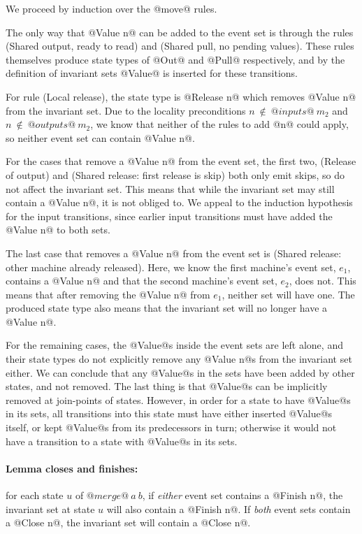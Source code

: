 We proceed by induction over the @move@ rules.

The only way that @Value n@ can be added to the event set is through the rules (Shared output, ready to read) and (Shared pull, no pending values).
These rules themselves produce state types of @Out@ and @Pull@ respectively, and by the definition of invariant sets @Value@ is inserted for these transitions.

For rule (Local release), the state type is @Release n@ which removes @Value n@ from the invariant set.
Due to the locality preconditions $n~\not\in~@inputs@~m_2$ and $n~\not\in~@outputs@~m_2$, we know that neither of the rules to add @n@ could apply, so neither event set can contain @Value n@.

For the cases that remove a @Value n@ from the event set, the first two, (Release of output) and (Shared release: first release is skip) both only emit skips, so do not affect the invariant set.
This means that while the invariant set may still contain a @Value n@, it is not obliged to.
We appeal to the induction hypothesis for the input transitions, since earlier input transitions must have added the @Value n@ to both sets.

The last case that removes a @Value n@ from the event set is (Shared release: other machine already released).
Here, we know the first machine's event set, $e_1$, contains a @Value n@ and that the second machine's event set, $e_2$, does not.
This means that after removing the @Value n@ from $e_1$, neither set will have one.
The produced state type also means that the invariant set will no longer have a @Value n@.

For the remaining cases, the @Value@s inside the event sets are left alone, and their state types do not explicitly remove any @Value n@s from the invariant set either.
We can conclude that any @Value@s in the sets have been added by other states, and not removed.
The last thing is that @Value@s can be implicitly removed at join-points of states.
However, in order for a state to have @Value@s in its sets, all transitions into this state must have either inserted @Value@s itself, or kept @Value@s from its predecessors in turn; otherwise it would not have a transition to a state with @Value@s in its sets.

\paragraph{Lemma closes and finishes:} 
for each state $u$ of $@merge@~a~b$, if \emph{either} event set contains a @Finish n@, the invariant set at state $u$ will also contain a @Finish n@.
If \emph{both} event sets contain a @Close n@, the invariant set will contain a @Close n@.

